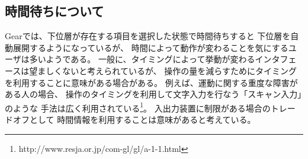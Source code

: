 \documentclass[twoside]{wiss}
\def\GEAR{\textsf{Gear}}
\begin{document}

% 

% 


\subsection{時間待ちについて}

{\GEAR}では、下位層が存在する項目を選択した状態で時間待ちすると
下位層を自動展開するようになっているが、
時間によって動作が変わることを気にするユーザは多いようである。
%
一般に、タイミングによって挙動が変わるインタフェースは望ましくないと考えられているが、
操作の量を減らすためにタイミングを利用することに意味がある場合がある。
例えば、運動に関する重度な障害がある人の場合、
操作のタイミングを利用して文字入力を行なう「スキャン入力」のような
手法は広く利用されている\footnote{
  \textsf{http://www.resja.or.jp/com-gl/gl/a-1-1.html}
}。
入出力装置に制限がある場合のトレードオフとして
時間情報を利用することは意味があると考えている。

\end{document}
